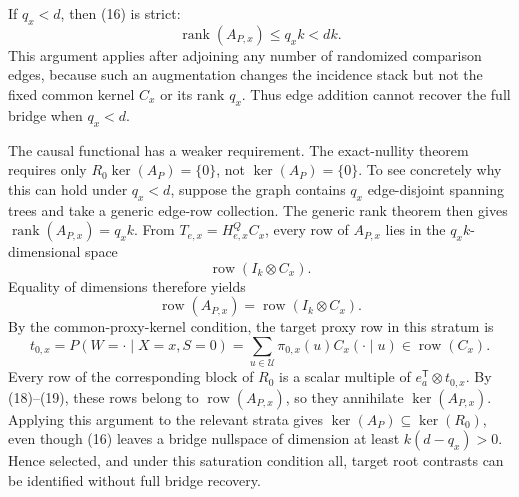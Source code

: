 If \(q_x<d\), then (16) is strict:
\[
\operatorname{rank}(A_{P,x})\leq q_xk<dk.
\]
This argument applies after adjoining any number of randomized comparison edges, because such an augmentation changes the incidence stack but not the fixed common kernel \(C_x\) or its rank \(q_x\).  Thus edge addition cannot recover the full bridge when \(q_x<d\).

The causal functional has a weaker requirement.  The exact-nullity theorem requires only \(R_0\ker(A_P)=\{0\}\), not \(\ker(A_P)=\{0\}\).  To see concretely why this can hold under \(q_x<d\), suppose the graph contains \(q_x\) edge-disjoint spanning trees and take a generic edge-row collection.  The generic rank theorem then gives \(\operatorname{rank}(A_{P,x})=q_xk\).  From \(T_{e,x}=H^Q_{e,x}C_x\), every row of \(A_{P,x}\) lies in the \(q_xk\)-dimensional space
\[
\operatorname{row}(I_k\otimes C_x).
\]
Equality of dimensions therefore yields
\[
\operatorname{row}(A_{P,x})=\operatorname{row}(I_k\otimes C_x).
\tag{18}
\]
By the common-proxy-kernel condition, the target proxy row in this stratum is
\[
t_{0,x}=P(W=\mathord\cdot\mid X=x,S=0)
=\sum_{u\in\mathcal U}\pi_{0,x}(u)C_x(\mathord\cdot\mid u)
\in\operatorname{row}(C_x).
\tag{19}
\]
Every row of the corresponding block of \(R_0\) is a scalar multiple of \(e_a^{\mathsf T}\otimes t_{0,x}\).  By (18)--(19), these rows belong to \(\operatorname{row}(A_{P,x})\), so they annihilate \(\ker(A_{P,x})\).  Applying this argument to the relevant strata gives \(\ker(A_P)\subseteq\ker(R_0)\), even though (16) leaves a bridge nullspace of dimension at least \(k(d-q_x)>0\).  Hence selected, and under this saturation condition all, target root contrasts can be identified without full bridge recovery.
